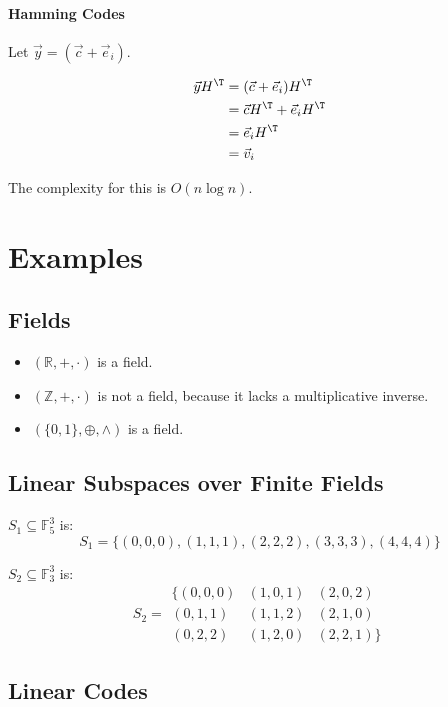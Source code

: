 \documentclass{idc_msc}
\begin{document}
\paragraph{Hamming Codes}

Let \(\vec{y} = (\vec{c} + \vec{e}_i)\).

\[
\begin{aligned}
\vec{y}H^\T & = (\vec{c} + \vec{e}_i) H^\T \\
& = \vec{c}H^\T + \vec{e}_i H^\T \\
& = \vec{e}_i H^\T \\
& = \vec{v}_i
\end{aligned}
\]

The complexity for this is \(O(n \log n)\).

\section{Examples}

\subsection{Fields}

\begin{itemize}
  \item \((\mathbb{R}, +, \cdot)\) is a field.
  \item \((\mathbb{Z}, +, \cdot)\) is not a field, because it lacks a multiplicative inverse.
  \item \((\{0,1\}, \oplus, \land)\) is a field.
\end{itemize}

\subsection{Linear Subspaces over Finite Fields}

\(S_1 \subseteq \mathbb{F}_5^3\) is:
\[S_1 = \{(0,0,0), (1,1,1), (2,2,2), (3,3,3), (4,4,4)\}\]

\(S_2 \subseteq \mathbb{F}_3^3\) is:
\[
  S_2 =
  \begin{matrix}
    \{(0,0,0) & (1,0,1) & (2,0,2) \\
    (0,1,1) & (1,1,2) & (2,1,0) \\
    (0,2,2) & (1,2,0) & (2,2,1)\}
  \end{matrix}
\]

\subsection{Linear Codes}
\end{document}
